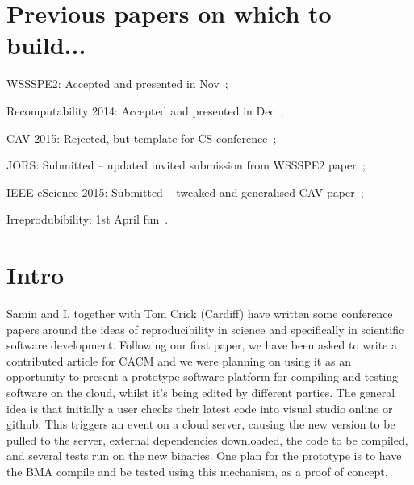 \documentclass[a4paper,11pt]{article}
\begin{document}

\section*{Previous papers on which to build...}
\begin{compactdesc}
\item[WSSSPE2:] Accepted and presented in Nov~\cite{crick-et-al_wssspe2};
\item[Recomputability 2014:] Accepted and presented in Dec~\cite{crick-et-al_recomp2014};
\item[CAV 2015:] Rejected, but template for CS
  conference~\cite{crick-et-al-cav};
\item[JORS:] Submitted -- updated invited submission from WSSSPE2
  paper~\cite{crick-et-al:2015};
\item[IEEE eScience 2015:] Submitted -- tweaked and generalised CAV
  paper~\cite{crick-et-al_escience};
\item[Irreprodubibility:] 1st April fun~\cite{chuehong-et-al:2015}.
\end{compactdesc}

\section{Intro}


Samin and I, together with Tom Crick (Cardiff) have written some
conference papers around the ideas of reproducibility in science and specifically in
scientific software development. Following our first paper, we have
been asked to write a contributed article for CACM and we were
planning on using it as an opportunity to present a prototype software
platform for compiling and testing software on the cloud, whilst it's
being edited by different parties. The general idea is that initially
a user checks their latest code into visual studio online or
github. This triggers an event on a cloud server, causing the new
version to be pulled to the server, external dependencies downloaded,
the code to be compiled, and several tests run on the new
binaries. One plan for the prototype is to have the BMA compile and be
tested using this mechanism, as a proof of concept.
\end{document}

